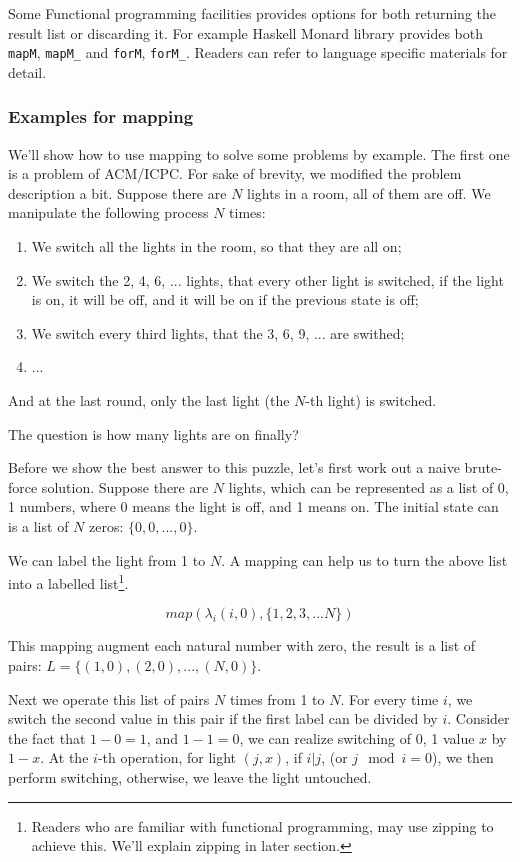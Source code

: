 \documentclass{article}
\begin{document}
Some Functional programming facilities provides options for both returning the result list or discarding it.
For example Haskell Monard library provides both \verb|mapM|, \verb|mapM_| and \verb|forM|, \verb|forM_|. 
Readers can refer to language specific materials for detail.

\subsubsection{Examples for mapping}

We'll show how to use mapping to solve some problems by example. The first one is a problem of ACM/ICPC\cite{poj-drunk-jailer}.
For sake of brevity, we modified the problem description a bit. Suppose there are $N$ lights in a room, all
of them are off. We manipulate the following process $N$ times:

\begin{enumerate}
\item We switch all the lights in the room, so that they are all on;
\item We switch the 2, 4, 6, ... lights, that every other light is switched, if the light is on, it will be off, and it will be
on if the previous state is off;
\item We switch every third lights, that the 3, 6, 9, ... are swithed;
\item ...
\end{enumerate}

And at the last round, only the last light (the $N$-th light) is switched.

The question is how many lights are on finally?

Before we show the best answer to this puzzle, let's first work out a naive brute-force solution.
Suppose there are $N$ lights, which can be represented as a list of 0, 1 numbers, where 0 means the light
is off, and 1 means on. The initial state can is a list of $N$ zeros: $\{0, 0, ..., 0\}$.

We can label the light from 1 to $N$. A mapping can help us to turn the above list into a labelled list\footnote{Readers
who are familiar with functional programming, may use zipping to achieve this. We'll explain zipping in later 
section.}.

\[
map(\lambda_i(i, 0), \{1, 2, 3, ... N\})
\]

This mapping augment each natural number with zero, the result is a list of pairs: $L = \{(1, 0), (2, 0), ..., (N, 0)\}$.

Next we operate this list of pairs $N$ times from 1 to $N$. For every time $i$, we switch the second value in this pair
if the first label can be divided by $i$. Consider the fact that $1 - 0 = 1$, and $1 - 1 = 0$, we can realize switching
of 0, 1 value $x$ by $1 - x$. At the $i$-th operation, for light $(j, x)$, if $i | j$, (or $j \mod i = 0$), we then 
perform switching, otherwise, we leave the light untouched. 
\end{document}
